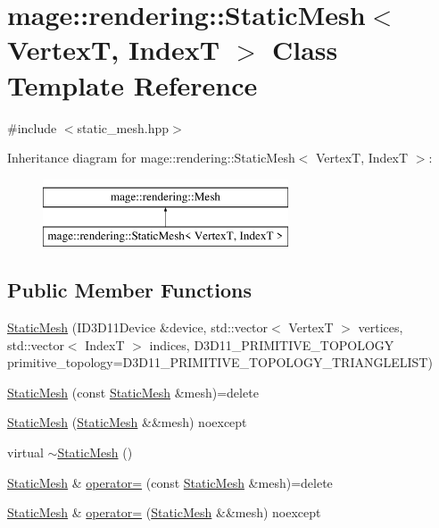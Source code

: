 \hypertarget{classmage_1_1rendering_1_1_static_mesh}{}\section{mage\+:\+:rendering\+:\+:Static\+Mesh$<$ VertexT, IndexT $>$ Class Template Reference}
\label{classmage_1_1rendering_1_1_static_mesh}


{\ttfamily \#include $<$static\+\_\+mesh.\+hpp$>$}

Inheritance diagram for mage\+:\+:rendering\+:\+:Static\+Mesh$<$ VertexT, IndexT $>$\+:\begin{figure}[H]
\begin{center}
\leavevmode
\includegraphics[height=2.000000cm]{classmage_1_1rendering_1_1_static_mesh}
\end{center}
\end{figure}
\subsection*{Public Member Functions}
\begin{DoxyCompactItemize}
\item 
\mbox{\hyperlink{classmage_1_1rendering_1_1_static_mesh_a99a189dbe9ff6f095063967f68c7285d}{Static\+Mesh}} (I\+D3\+D11\+Device \&device, std\+::vector$<$ VertexT $>$ vertices, std\+::vector$<$ IndexT $>$ indices, D3\+D11\+\_\+\+P\+R\+I\+M\+I\+T\+I\+V\+E\+\_\+\+T\+O\+P\+O\+L\+O\+GY primitive\+\_\+topology=D3\+D11\+\_\+\+P\+R\+I\+M\+I\+T\+I\+V\+E\+\_\+\+T\+O\+P\+O\+L\+O\+G\+Y\+\_\+\+T\+R\+I\+A\+N\+G\+L\+E\+L\+I\+ST)
\item 
\mbox{\hyperlink{classmage_1_1rendering_1_1_static_mesh_a0e824924504f75bbfa578caf0637dd2a}{Static\+Mesh}} (const \mbox{\hyperlink{classmage_1_1rendering_1_1_static_mesh}{Static\+Mesh}} \&mesh)=delete
\item 
\mbox{\hyperlink{classmage_1_1rendering_1_1_static_mesh_a7cf948089fc5ceae5284bab45f216a75}{Static\+Mesh}} (\mbox{\hyperlink{classmage_1_1rendering_1_1_static_mesh}{Static\+Mesh}} \&\&mesh) noexcept
\item 
virtual \mbox{\hyperlink{classmage_1_1rendering_1_1_static_mesh_a44fd6319f4a56ff20bc81fb9968dac05}{$\sim$\+Static\+Mesh}} ()
\item 
\mbox{\hyperlink{classmage_1_1rendering_1_1_static_mesh}{Static\+Mesh}} \& \mbox{\hyperlink{classmage_1_1rendering_1_1_static_mesh_a62f007ca9d1dc316519468fb7b74af19}{operator=}} (const \mbox{\hyperlink{classmage_1_1rendering_1_1_static_mesh}{Static\+Mesh}} \&mesh)=delete
\item 
\mbox{\hyperlink{classmage_1_1rendering_1_1_static_mesh}{Static\+Mesh}} \& \mbox{\hyperlink{classmage_1_1rendering_1_1_static_mesh_ab4b3e0d32af550bf440cc2aaf731a350}{operator=}} (\mbox{\hyperlink{classmage_1_1rendering_1_1_static_mesh}{Static\+Mesh}} \&\&mesh) noexcept
\end{DoxyCompactItemize}
